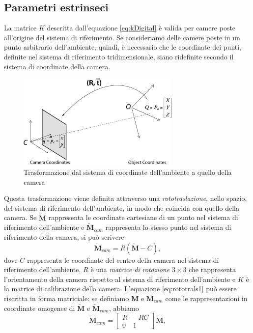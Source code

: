  \subsection{Parametri estrinseci}
 La matrice $K$ descritta dall'equazione \eqref{eq:kDigital} \`e valida per camere poste all'origine del sistema di riferimento.
Se consideriamo delle camere poste in un punto arbitrario dell'ambiente, quindi, \`e necessario che le coordinate dei punti, definite nel sistema di riferimento tridimensionale, siano ridefinite secondo il sistema di coordinate della camera.
 \begin{figure}
 	\centering
 	\includegraphics[width=8cm]{./pictures/rt}
 	\caption{Trasformazione dal sistema di coordinate dell'ambiente a quello della camera}
 	\label{fig:rt}
 \end{figure}
Questa trasformazione viene definita attraverso una \textit{rototraslazione}, nello spazio, del sistema di riferimento dell'ambiente, in modo che coincida con quello della camera.
Se $\tilde{\textbf{M}}$ rappresenta le coordinate cartesiane di un punto nel sistema di riferimento dell'ambiente e $\tilde{\textbf{M}}_{cam}$ rappresenta lo stesso punto nel sistema di riferimento della camera, si pu\`o scrivere
\begin{equation}
\label{eq:rototrals1}
\tilde{\textbf{M}}_{cam}=R(\tilde{\textbf{M}} - C),
\end{equation}
dove $C$ rappresenta le coordinate del centro della camera nel sistema di riferimento dell'ambiente, $R$ \`e una \textit{matrice di rotazione} $3 \times 3$ che rappresenta l'orientamento della camera rispetto al sistema di riferimento dell'ambiente e $K$ \`e la matrice di calibrazione della camera.
L'equazione \eqref{eq:rototrals1} pu\`o essere riscritta in forma matriciale: se definiamo $\textbf{M}$ e $\textbf{M}_{cam}$ come le rappresentazioni in coordinate omogenee di $\tilde{\textbf{M}}$ e $\tilde{\textbf{M}}_{cam}$, abbiamo
\[ \textbf{M}_{cam} =  \left[\begin{array}{cc}
R & -RC \\
0 & 1
\end{array}\right] 
\textbf{M}, \]
